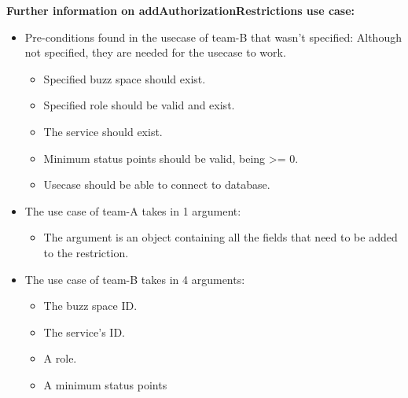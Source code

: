 \noindent
\medskip

\textbf{Further information on addAuthorizationRestrictions use case:}
\begin{itemize}
	\item	Pre-conditions found in the usecase of team-B that wasn't specified:
	\textnormal{Although not specified, they are needed for the usecase to work.}
		\begin{itemize}
		\item Specified buzz space should exist.  
		\item Specified role should be valid and exist.
		\item The service should exist.
		\item Minimum status points should be valid, being >= 0.
		\item Usecase should be able to connect to database. 
		\end{itemize}
	\item The use case of team-A takes in 1 argument:
		\begin{itemize}
		\item The argument is an object containing all the fields that need to be added to the restriction.
		
		\end{itemize}
	\item The use case of team-B takes in 4 arguments:
		\begin{itemize}
		\item The buzz space ID.
		\item The service's ID.
		\item A role.
		\item A minimum status points		
		\end{itemize}
	  

\end{itemize}






